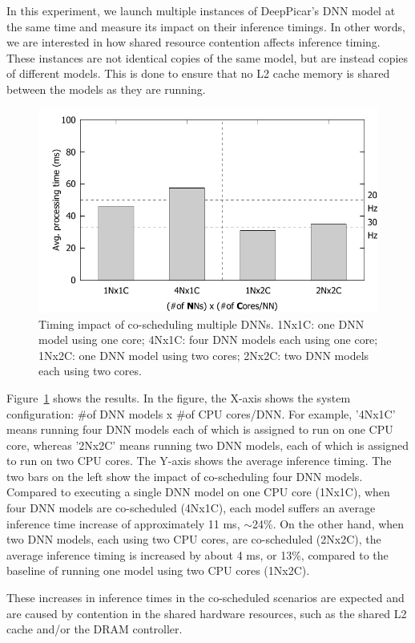 In this experiment, we launch multiple instances of DeepPicar's DNN
model at the same time and measure its impact on their inference
timings. In other words, we are interested in how shared resource
contention affects inference timing. These instances are not identical
copies of the same model, but are instead copies of different models. 
This is done to ensure that no L2 cache memory is shared between the 
models as they are running.

\begin{figure}[h]
  \centering
  \includegraphics[width=.7\textwidth]{figs/perf_vs_modelcnt}
  \caption{Timing impact of co-scheduling multiple DNNs. 1Nx1C: one DNN
    model using one core; 4Nx1C: four DNN models each using one core;
    1Nx2C: one DNN model using two cores; 2Nx2C: two DNN models each
    using two cores.} 
  \label{fig:perf-vs-modelcnt}
\end{figure}

Figure~\ref{fig:perf-vs-modelcnt} shows the results. In the figure, the
X-axis shows the system configuration: \#of DNN models x \#of CPU
cores/DNN. For example, '4Nx1C' means running four DNN models each of
which is assigned to run on one CPU core, whereas '2Nx2C' means running
two DNN models, each of which is assigned to run on two CPU
cores. The Y-axis shows the average inference timing.
The two bars on the left show the impact of co-scheduling four DNN
models. Compared to executing a single DNN model on one CPU core
(1Nx1C), when four DNN models are co-scheduled (4Nx1C), each model
suffers an average inference time increase of approximately 11 ms,
$\sim$24\%. On the other hand, when two DNN models, each using two CPU
cores, are co-scheduled (2Nx2C), the average inference timing is increased by
about 4 ms, or 13\%, compared to the baseline of running one model
using two CPU cores (1Nx2C). 

These increases in inference times in the co-scheduled scenarios are
expected and are caused by contention in the shared hardware
resources, such as the shared L2 cache and/or the DRAM controller.

